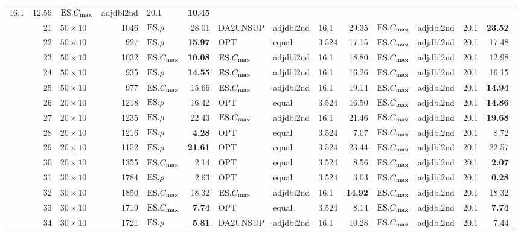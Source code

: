 {\begin{longtable}{l@{}rlr|l@{ }r|l@{ }l@{ }l@{ }r|l@{ }l@{ }l@{ }r}
  16.1 & 12.59 & $\text{ES}.{C_{\max}}$ & adjdbl2nd & 20.1 & \textbf{10.45} \\ 
  &21 & $50\times10$ & 1046 & $\text{ES}.{\rho}$ & 28.01 & DA2UNSUP & adjdbl2nd & 
  16.1 & 29.35 & $\text{ES}.{C_{\max}}$ & adjdbl2nd & 20.1 & \textbf{23.52} \\ 
  &22 & $50\times10$ & 927 & $\text{ES}.{\rho}$ & \textbf{15.97} & OPT & equal & 3.524 & 
  17.15 & $\text{ES}.{C_{\max}}$ & adjdbl2nd & 20.1 & 17.48 \\ 
  &23 & $50\times10$ & 1032 & $\text{ES}.{C_{\max}}$ & \textbf{10.08} & $\text{ES}.{C_{\max}}$ & 
  adjdbl2nd & 16.1 & 18.80 & $\text{ES}.{C_{\max}}$ & adjdbl2nd & 20.1 & 12.98 \\ 
  &24 & $50\times10$ & 935 & $\text{ES}.{\rho}$ & \textbf{14.55} & $\text{ES}.{C_{\max}}$ & 
  adjdbl2nd & 16.1 & 16.26 & $\text{ES}.{C_{\max}}$ & adjdbl2nd & 20.1 & 16.15 \\ 
  &25 & $50\times10$ & 977 & $\text{ES}.{C_{\max}}$ & 15.66 & $\text{ES}.{C_{\max}}$ & adjdbl2nd 
  & 16.1 & 19.14 & $\text{ES}.{C_{\max}}$ & adjdbl2nd & 20.1 & \textbf{14.94} \\ 
  &26 & $20\times10$ & 1218 & $\text{ES}.{\rho}$ & 16.42 & OPT & equal & 3.524 & 
  16.50 & $\text{ES}.{C_{\max}}$ & adjdbl2nd & 20.1 & \textbf{14.86} \\ 
  &27 & $20\times10$ & 1235 & $\text{ES}.{\rho}$ & 22.43 & $\text{ES}.{C_{\max}}$ & adjdbl2nd 
  & 16.1 & 21.46 & $\text{ES}.{C_{\max}}$ & adjdbl2nd & 20.1 & \textbf{19.68} \\ 
  &28 & $20\times10$ & 1216 & $\text{ES}.{\rho}$ & \textbf{4.28} & OPT & equal & 3.524 & 
  7.07 & $\text{ES}.{C_{\max}}$ & adjdbl2nd & 20.1 & 8.72 \\ 
  &29 & $20\times10$ & 1152 & $\text{ES}.{\rho}$ & \textbf{21.61} & OPT & equal & 3.524 
  & 23.44 & $\text{ES}.{C_{\max}}$ & adjdbl2nd & 20.1 & 22.57 \\ 
  &30 & $20\times10$ & 1355 & $\text{ES}.{C_{\max}}$ & 2.14 & OPT & equal & 3.524 & 
  8.56 & $\text{ES}.{C_{\max}}$ & adjdbl2nd & 20.1 & \textbf{2.07} \\ 
  &31 & $30\times10$ & 1784 & $\text{ES}.{\rho}$ & 2.63 & OPT & equal & 3.524 & 
  3.03 & $\text{ES}.{C_{\max}}$ & adjdbl2nd & 20.1 & \textbf{0.28} \\ 
  &32 & $30\times10$ & 1850 & $\text{ES}.{C_{\max}}$ & 18.32 & $\text{ES}.{C_{\max}}$ & adjdbl2nd 
  & 16.1 & \textbf{14.92} & $\text{ES}.{C_{\max}}$ & adjdbl2nd & 20.1 & 18.32 \\ 
  &33 & $30\times10$ & 1719 & $\text{ES}.{C_{\max}}$ & \textbf{7.74} & OPT & equal & 3.524 
  & 8.14 & $\text{ES}.{C_{\max}}$ & adjdbl2nd & 20.1 & \textbf{7.74} \\ 
  &34 & $30\times10$ & 1721 & $\text{ES}.{\rho}$ & \textbf{5.81} & DA2UNSUP & adjdbl2nd 
  & 16.1 & 10.28 & $\text{ES}.{C_{\max}}$ & adjdbl2nd & 20.1 & 7.44 \\ 

\end{longtable}}
